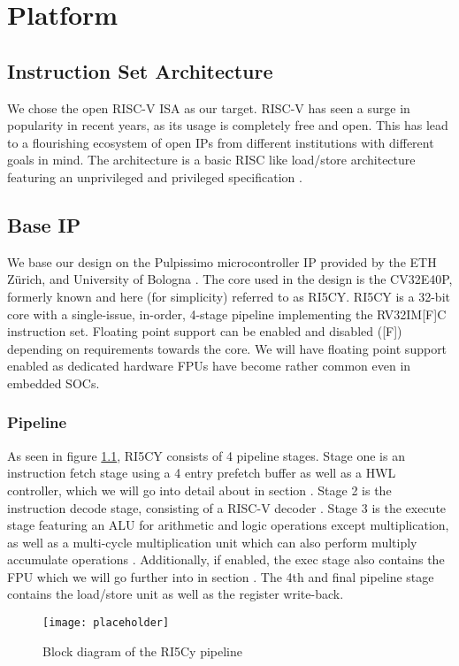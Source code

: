\documentclass[../bachelor_paper.tex]{subfiles}
\begin{document}
\chapter{Platform}
    \label{ch:plat}

\section{Instruction Set Architecture}
We chose the open RISC-V \ac{ISA} as our target. RISC-V has seen a surge in popularity in recent years, as its usage is completely free and open. This has lead to a flourishing ecosystem of open IPs from different institutions with different goals in mind. The architecture is a basic RISC like load/store architecture featuring an unprivileged and privileged specification \cite{RISCVInstructionSet2022}.

\section{Base IP}
We base our design on the Pulpissimo microcontroller IP provided by the ETH Z\"urich, and University of Bologna \cite{schiavoneQuentinUltraLowPowerPULPissimo2018}. The core used in the design is the CV32E40P, formerly known and here (for simplicity) referred to as RI5CY. RI5CY is a 32-bit core with a single-issue, in-order, 4-stage pipeline implementing the RV32IM[F]C instruction set. Floating point support can be enabled and disabled ([F]) depending on requirements towards the core. We will have floating point support enabled as dedicated hardware \acp{FPU} have become rather common even in embedded \acp{SOC}. 

\subsection{Pipeline}
As seen in figure \ref{fig:plat/base/blockdia}, RI5CY consists of 4 pipeline stages. Stage one is an instruction fetch stage using a 4 entry prefetch buffer as well as a \ac{HWL} controller, which we will go into detail about in section . Stage 2 is the instruction decode stage, consisting of a RISC-V decoder . Stage 3 is the execute stage featuring an \ac{ALU} for arithmetic and logic operations except multiplication, as well as a multi-cycle multiplication unit which can also perform multiply accumulate operations . Additionally, if enabled, the exec stage also contains the \ac{FPU} which we will go further into in section . The 4th and final pipeline stage contains the load/store unit as well as the register write-back.

\begin{figure}
    \centering
    \texttt{[image: placeholder]}
    \caption{Block diagram of the RI5Cy pipeline}
    \label{fig:plat/base/blockdia}
\end{figure}


\isstandalone



\fi
\end{document}
